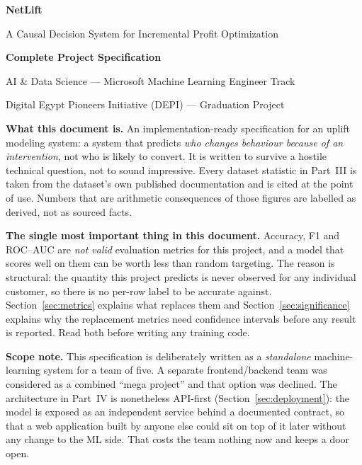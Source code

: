 \documentclass[11pt,a4paper]{article}
\begin{document}
\thispagestyle{empty}
\begin{center}
\vspace*{0.2cm}
{\Huge\bfseries\color{navy} NetLift\par}
\vspace{0.35cm}
{\LARGE A Causal Decision System for Incremental Profit Optimization\par}
\vspace{0.9cm}
{\Large\bfseries Complete Project Specification\par}
\vspace{0.55cm}
{\large AI \& Data Science --- Microsoft Machine Learning Engineer Track\par}
{\large Digital Egypt Pioneers Initiative (DEPI) --- Graduation Project\par}
\end{center}

\vspace{0.6cm}

\begin{keybox}
\textbf{What this document is.} An implementation-ready specification for an uplift
modeling system: a system that predicts \emph{who changes behaviour because of an
intervention}, not who is likely to convert. It is written to survive a hostile technical
question, not to sound impressive. Every dataset statistic in Part~III is taken from the
dataset's own published documentation and is cited at the point of use. Numbers that are
arithmetic consequences of those figures are labelled as derived, not as sourced facts.
\end{keybox}

\begin{alertbox}
\textbf{The single most important thing in this document.} Accuracy, F1 and ROC--AUC are
\emph{not valid} evaluation metrics for this project, and a model that scores well on them
can be worth less than random targeting. The reason is structural: the quantity this project
predicts is never observed for any individual customer, so there is no per-row label to be
accurate against. Section~\ref{sec:metrics} explains what replaces them and
Section~\ref{sec:significance} explains why the replacement metrics need confidence intervals
before any result is reported. Read both before writing any training code.
\end{alertbox}

\begin{keybox}
\textbf{Scope note.} This specification is deliberately written as a \emph{standalone}
machine-learning system for a team of five. A separate frontend/backend team was considered
as a combined ``mega project'' and that option was declined. The architecture in
Part~IV is nonetheless API-first (Section~\ref{sec:deployment}): the model is exposed as an
independent service behind a documented contract, so that a web application built by anyone
else could sit on top of it later without any change to the ML side. That costs the team
nothing now and keeps a door open.
\end{keybox}
\end{document}
